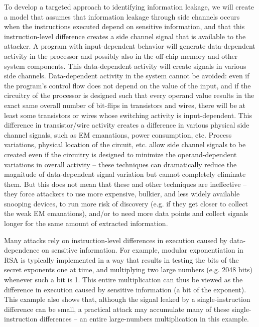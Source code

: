 To develop a targeted approach to identifying information leakage, we will create a model that assumes that information leakage through side channels occurs when the instructions executed depend on sensitive information, and that this instruction-level difference creates a side channel signal that is available to the attacker. A program with input-dependent behavior will generate data-dependent activity in the processor and possibly also in the off-chip memory and other system components. This data-dependent activity will create signals in various side channels. Data-dependent activity in the system cannot be avoided: even if the program's control flow does not depend on the value of the input, and if the circuitry of the processor is designed such that every operand value results in the exact same overall number of bit-flips in transistors and wires, there will be at least some transistors or wires whose switching activity is input-dependent. This difference in transistor/wire activity creates a difference in various physical side channel signals, such as EM emanations, power consumption, etc. Process variations, physical location of the circuit, etc. allow side channel signals to be created even if the circuitry is designed to minimize the operand-dependent variations in overall activity -- these techniques can dramatically reduce the magnitude of data-dependent signal variation but cannot completely eliminate them. But this does not mean that these and other techniques are ineffective -- they force attackers to use more expensive, bulkier, and less widely available snooping devices, to run more risk of discovery (e.g. if they get closer to collect the weak EM emanations), and/or to need more data points and collect signals longer for the same amount of extracted information.

Many attacks rely on instruction-level differences in execution caused by data-dependence on sensitive information. For example, modular exponentiation in RSA is typically implemented in a way that results in testing the bits of the secret exponents one at time, and multiplying two large numbers (e.g. 2048 bits) whenever such a bit is 1. This entire multiplication can thus be viewed as the difference in execution caused by sensitive information (a bit of the exponent). This example also shows that, although the signal leaked by a single-instruction difference can be small, a practical attack may accumulate many of these single-instruction differences -- an entire large-numbers multiplication in this example. 

